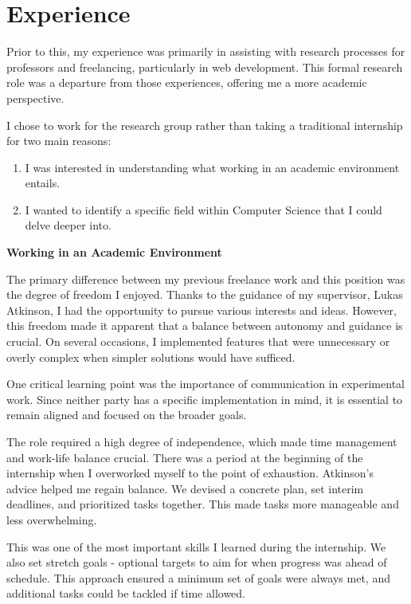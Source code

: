 \chapter{\centering Experience}

Prior to this, my experience was primarily in assisting with research processes
for professors and freelancing, particularly in web development. This formal
research role was a departure from those experiences, offering me a more
academic perspective.

I chose to work for the research group rather than taking a traditional
internship for two main reasons:

\begin{enumerate} \item I was interested in understanding what working in an
academic environment entails. \item I wanted to identify a specific field
within Computer Science that I could delve deeper into. \end{enumerate}

\textbf{Working in an Academic Environment}

The primary difference between my previous freelance work and this position was
the degree of freedom I enjoyed. Thanks to the guidance of my supervisor, Lukas
Atkinson, I had the opportunity to pursue various interests and ideas. However,
this freedom made it apparent that a balance between autonomy and guidance is
crucial. On several occasions, I implemented features that were unnecessary or
overly complex when simpler solutions would have sufficed.

One critical learning point was the importance of communication in experimental work.
Since neither party has a specific implementation in mind, it is essential to
remain aligned and focused on the broader goals.

The role required a high degree of independence, which made time management and
work-life balance crucial. There was a period at the beginning of the
internship when I overworked myself to the point of exhaustion. Atkinson's
advice helped me regain balance. We devised a concrete plan, set interim
deadlines, and prioritized tasks together. This made tasks more manageable and
less overwhelming.

This was one of the most important skills I learned during the internship. We
also set stretch goals - optional targets to aim for when progress was ahead of
schedule. This approach ensured a minimum set of goals were always met, and
additional tasks could be tackled if time allowed.

